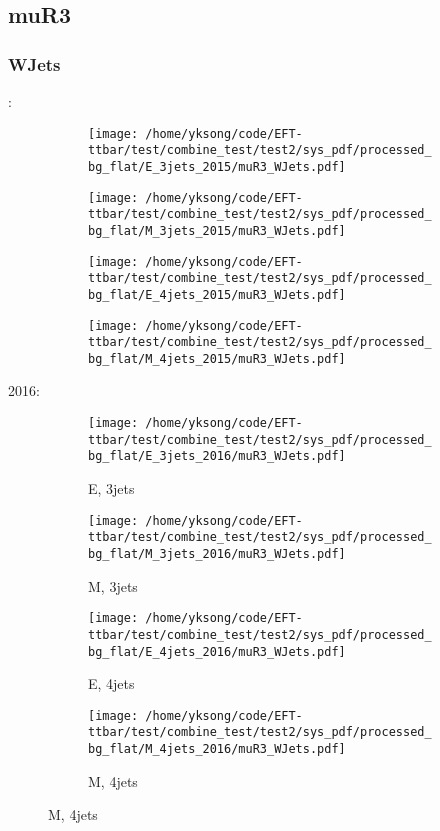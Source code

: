 \documentclass{beamer}
\begin{document}
\subsection{muR3}

\begin{frame}
\frametitle{WJets}
\fontsize{5}{1}:
\begin{figure}
\centering
\begin{subfigure}[b]{0.24\textwidth}
\texttt{[image: /home/yksong/code/EFT-ttbar/test/combine\_test/test2/sys\_pdf/processed\_bg\_flat/E\_3jets\_2015/muR3\_WJets.pdf]}
\end{subfigure}
\begin{subfigure}[b]{0.24\textwidth}
\texttt{[image: /home/yksong/code/EFT-ttbar/test/combine\_test/test2/sys\_pdf/processed\_bg\_flat/M\_3jets\_2015/muR3\_WJets.pdf]}
\end{subfigure}
\begin{subfigure}[b]{0.24\textwidth}
\texttt{[image: /home/yksong/code/EFT-ttbar/test/combine\_test/test2/sys\_pdf/processed\_bg\_flat/E\_4jets\_2015/muR3\_WJets.pdf]}
\end{subfigure}
\begin{subfigure}[b]{0.24\textwidth}
\texttt{[image: /home/yksong/code/EFT-ttbar/test/combine\_test/test2/sys\_pdf/processed\_bg\_flat/M\_4jets\_2015/muR3\_WJets.pdf]}
\end{subfigure}
\end{figure}
2016:
\begin{figure}
\centering
\begin{subfigure}[b]{0.24\textwidth}
\texttt{[image: /home/yksong/code/EFT-ttbar/test/combine\_test/test2/sys\_pdf/processed\_bg\_flat/E\_3jets\_2016/muR3\_WJets.pdf]}
\captionsetup{font=tiny}
\caption{E, 3jets}
\end{subfigure}
\begin{subfigure}[b]{0.24\textwidth}
\texttt{[image: /home/yksong/code/EFT-ttbar/test/combine\_test/test2/sys\_pdf/processed\_bg\_flat/M\_3jets\_2016/muR3\_WJets.pdf]}
\captionsetup{font=tiny}
\caption{M, 3jets}
\end{subfigure}
\begin{subfigure}[b]{0.24\textwidth}
\texttt{[image: /home/yksong/code/EFT-ttbar/test/combine\_test/test2/sys\_pdf/processed\_bg\_flat/E\_4jets\_2016/muR3\_WJets.pdf]}
\captionsetup{font=tiny}
\caption{E, 4jets}
\end{subfigure}
\begin{subfigure}[b]{0.24\textwidth}
\texttt{[image: /home/yksong/code/EFT-ttbar/test/combine\_test/test2/sys\_pdf/processed\_bg\_flat/M\_4jets\_2016/muR3\_WJets.pdf]}
\captionsetup{font=tiny}
\caption{M, 4jets}
\end{subfigure}
\end{figure}
\end{frame}
\end{document}
